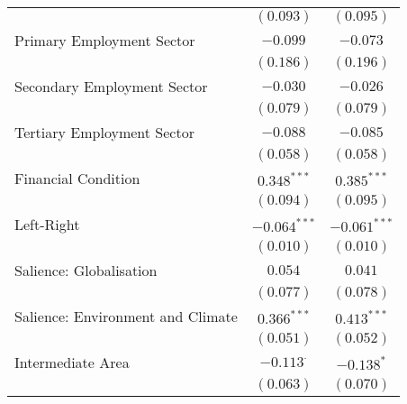 \begin{center}
\begin{tiny}
\begin{longtable}{l@{} c@{} c@{}}
                                                                            & $(0.093)$        & $(0.095)$        \\
\quad Primary Employment Sector                                             & $-0.099$         & $-0.073$         \\
                                                                            & $(0.186)$        & $(0.196)$        \\
\quad Secondary Employment Sector                                           & $-0.030$         & $-0.026$         \\
                                                                            & $(0.079)$        & $(0.079)$        \\
\quad Tertiary Employment Sector                                            & $-0.088$         & $-0.085$         \\
                                                                            & $(0.058)$        & $(0.058)$        \\
\quad Financial Condition                                                   & $0.348^{***}$    & $0.385^{***}$    \\
                                                                            & $(0.094)$        & $(0.095)$        \\
\quad Left-Right                                                            & $-0.064^{***}$   & $-0.061^{***}$   \\
                                                                            & $(0.010)$        & $(0.010)$        \\
\quad Salience: Globalisation                                               & $0.054$          & $0.041$          \\
                                                                            & $(0.077)$        & $(0.078)$        \\
\quad Salience: Environment and Climate                                     & $0.366^{***}$    & $0.413^{***}$    \\
                                                                            & $(0.051)$        & $(0.052)$        \\
\quad Intermediate Area                                                     & $-0.113^{\cdot}$ & $-0.138^{*}$     \\
                                                                            & $(0.063)$        & $(0.070)$        \\

\end{longtable}
\end{tiny}
\end{center}
